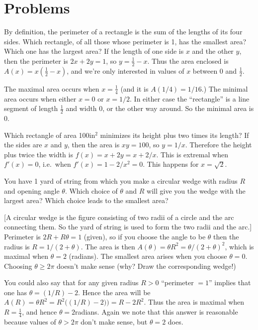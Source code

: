 \section{Problems}
\problemfont
\begin{multicols}{2}\setlength{\parindent}{0pt}
\problem By definition, the perimeter of a rectangle is the sum of the
lengths of its four sides.  Which rectangle, of all those whose
perimeter is 1, has the smallest area?  Which one has the largest
area?
\answer
If the length of one side is $x$ and the other $y$, then the perimeter
is $2x+2y = 1$, so $y=\frac12-x$.  Thus the area enclosed is $A(x) =
x(\frac12 - x)$, and we're only interested in values of $x$ between
$0$ and $\tfrac12$.

The maximal area occurs when $x=\tfrac14$ (and it is $A(1/4) = 1/16$.)
The minimal area occurs when either $x=0$ or $x=1/2$.  In either case
the ``rectangle'' is a line segment of length $\frac12$ and width 0,
or the other way around.  So the minimal area is $0$.
\endanswer


\problem Which rectangle of area 100in$^2$ minimizes its height plus
two times its length?
\answer
If the sides are $x$ and $y$, then the area is $xy = 100$, so $y=1/x$.
Therefore the height plus twice the width is $f(x) = x+2y = x+2/x$.
This is extremal when $f'(x) = 0$, i.e.\ when $f'(x) = 1-2/x^2 = 0$.
This happens for $x=\sqrt2$.
\endanswer


\problem You have 1 yard of string from which you make a circular
wedge with radius $R$ and opening angle $ \theta$.  Which choice of $
\theta$ and $R$ will give you the wedge with the largest area?  Which
choice leads to the smallest area?

[A circular wedge is the figure consisting of two radii of a circle
and the arc connecting them.  So the yard of string is used to form
the two radii and the arc.]
\answer
Perimeter is $2R+R\theta = 1$ (given), so if you choose the angle to
be $\theta$ then the radius is $R=1/(2+\theta)$.  The area is then
$A(\theta) = \theta R^2 = \theta/(2+\theta)^2$, which is maximal when
$\theta=2$ (radians).  The smallest area arises when you choose
$\theta=0$.  Choosing $\theta\ge 2\pi$ doesn't make sense (why?  Draw
the corresponding wedge!) 

You could also say that for any given radius $R>0$ ``perimeter
$=1$'' implies that one has $\theta = (1/R)-2$.  Hence the area
will be $A(R) =\theta R^2 = R^2\bigl( (1/R)-2 )\bigr) = R-2R^2$.  
Thus the area is maximal when $R=\frac14$, and hence
$\theta=2$radians.  Again we note that this answer is reasonable
because values of $\theta>2\pi$ don't make sense, but $\theta=2$
does.
\endanswer



\end{multicols}
